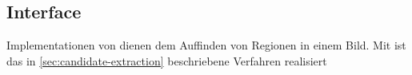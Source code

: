 \subsection*{Interface }
Implementationen von  dienen dem Auffinden von Regionen in einem Bild.
Mit  ist das in \autoref{sec:candidate-extraction} beschriebene Verfahren realisiert 

